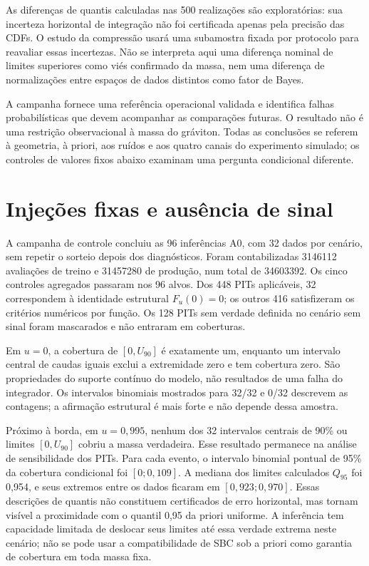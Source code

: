 As diferenças de quantis calculadas nas 500 realizações são
exploratórias: sua incerteza horizontal de integração não foi
certificada apenas pela precisão das CDFs. O estudo da compressão
usará uma subamostra fixada por protocolo para reavaliar essas
incertezas. Não se interpreta aqui uma diferença nominal de limites
superiores como viés confirmado da massa, nem uma diferença de
normalizações entre espaços de dados distintos como fator de Bayes.

A campanha fornece uma referência operacional validada e identifica
falhas probabilísticas que devem acompanhar as comparações futuras.
O resultado não é uma restrição observacional à massa do gráviton.
Todas as conclusões se referem à geometria, à priori, aos ruídos e
aos quatro canais do experimento simulado; os controles de valores
fixos abaixo examinam uma pergunta condicional diferente.
\section{Injeções fixas e ausência de sinal}
\label{sec:c07-injecoes-fixas}

A campanha de controle concluiu as 96 inferências A0, com 32 dados
por cenário, sem repetir o sorteio depois dos diagnósticos. Foram
contabilizadas 3146112 avaliações de treino e 31457280 de produção,
num total de 34603392. Os cinco controles agregados passaram nos
96 alvos. Dos 448 PITs aplicáveis, 32 correspondem à identidade
estrutural \(F_u(0)=0\); os outros 416 satisfizeram os critérios
numéricos por função. Os 128 PITs sem verdade definida no cenário
sem sinal foram mascarados e não entraram em coberturas.



Em \(u=0\), a cobertura de \([0,U_{90}]\) é exatamente um, enquanto
um intervalo central de caudas iguais exclui a extremidade zero e
tem cobertura zero. São propriedades do suporte contínuo do modelo,
não resultados de uma falha do integrador. Os intervalos binomiais
mostrados para 32/32 e 0/32 descrevem as contagens; a afirmação
estrutural é mais forte e não depende dessa amostra.

Próximo à borda, em \(u=0{,}995\), nenhum dos 32 intervalos centrais
de 90\% ou limites \([0,U_{90}]\) cobriu a massa verdadeira. Esse
resultado permanece na análise de sensibilidade dos PITs.
Para cada evento, o intervalo binomial pontual de 95\% da cobertura
condicional foi \([0;0{,}109]\). A mediana dos limites calculados
\(Q_{95}\) foi 0,954, e seus extremos entre os dados ficaram em
\([0{,}923;0{,}970]\). Essas descrições de quantis não constituem
certificados de erro horizontal, mas tornam visível a proximidade
com o quantil 0,95 da priori uniforme. A inferência tem capacidade
limitada de deslocar seus limites até essa verdade extrema neste
cenário; não se pode usar a compatibilidade de SBC sob a priori
como garantia de cobertura em toda massa fixa.

